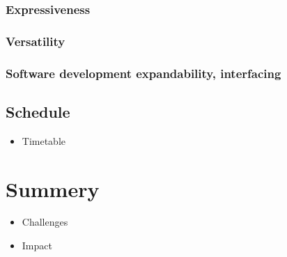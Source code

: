 \documentclass[a4paper,11pt]{article}
\begin{document}
\subsubsection{Expressiveness}
\subsubsection{Versatility}
\subsubsection{Software development expandability, interfacing}
\subsection{Schedule}
\begin{itemize}
\item Timetable
\end{itemize}

\section{Summery}
\begin{itemize}
\item Challenges
\item Impact
\end{itemize}



\end{document}
